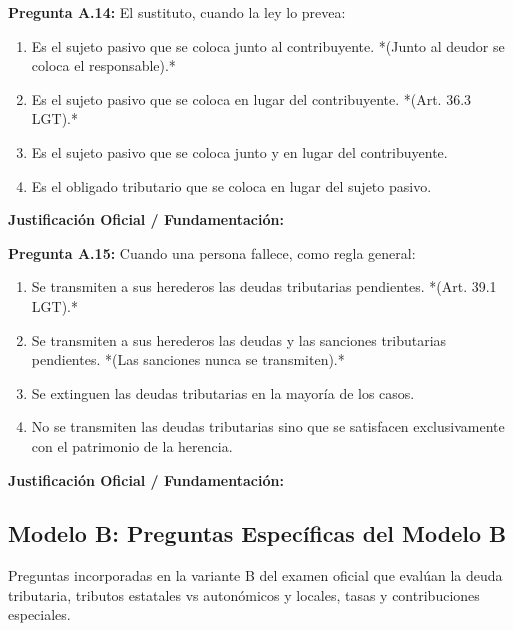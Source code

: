 \documentclass[11pt,a4paper,openany]{article}
\begin{document}
\noindent\textbf{\sffamily Pregunta A.14:} El sustituto, cuando la ley lo prevea:\\[0.15cm]
\begin{enumerate}[label=\textbf{\alph*)},leftmargin=1.8em,itemsep=1.5pt,topsep=2pt,partopsep=0pt,parsep=0pt]
    \item Es el sujeto pasivo que se coloca junto al contribuyente. *(Junto al deudor se coloca el responsable).*
    \item Es el sujeto pasivo que se coloca en lugar del contribuyente. *(Art. 36.3 LGT).*
    \item Es el sujeto pasivo que se coloca junto y en lugar del contribuyente.
    \item Es el obligado tributario que se coloca en lugar del sujeto pasivo.
\end{enumerate}
\begin{solucionBox}
\textbf{Justificación Oficial / Fundamentación:}\\[0.1cm]

\end{solucionBox}
\vspace{0.35cm}

\noindent\textbf{\sffamily Pregunta A.15:} Cuando una persona fallece, como regla general:\\[0.15cm]
\begin{enumerate}[label=\textbf{\alph*)},leftmargin=1.8em,itemsep=1.5pt,topsep=2pt,partopsep=0pt,parsep=0pt]
    \item Se transmiten a sus herederos las deudas tributarias pendientes. *(Art. 39.1 LGT).*
    \item Se transmiten a sus herederos las deudas y las sanciones tributarias pendientes. *(Las sanciones nunca se transmiten).*
    \item Se extinguen las deudas tributarias en la mayoría de los casos.
    \item No se transmiten las deudas tributarias sino que se satisfacen exclusivamente con el patrimonio de la herencia.
\end{enumerate}
\begin{solucionBox}
\textbf{Justificación Oficial / Fundamentación:}\\[0.1cm]

\end{solucionBox}
\vspace{0.35cm}

\newpage
\subsection{Modelo B: Preguntas Específicas del Modelo B}
\begin{enunciadoBox}
Preguntas incorporadas en la variante B del examen oficial que evalúan la deuda tributaria, tributos estatales vs autonómicos y locales, tasas y contribuciones especiales.
\end{enunciadoBox}
\vspace{0.4cm}
\end{document}
